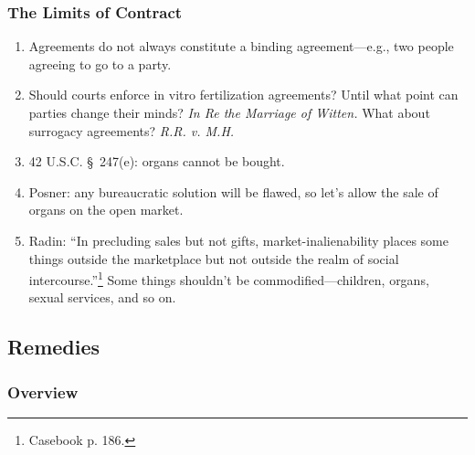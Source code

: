 \subsubsection{The Limits of Contract}

\begin{enumerate}
    \item Agreements do not always constitute a binding agreement---e.g., two 
    people agreeing to go to a party.
    \item Should courts enforce in vitro fertilization agreements? Until what 
    point can parties change their minds? \emph{In Re the Marriage of Witten.} 
    What about surrogacy agreements? \emph{R.R. v. M.H.}
    \item 42 U.S.C. \S\ 247(e): organs cannot be bought.
    \item Posner: any bureaucratic solution will be flawed, so let's allow the 
    sale of organs on the open market.
    \item Radin: ``In precluding sales but not gifts, market-inalienability 
    places some things outside the marketplace but not outside the realm of 
    social intercourse.''\footnote{Casebook p. 186.} Some things shouldn't be 
    commodified---children, organs, sexual services, and so on.
\end{enumerate}

\subsection{Remedies}

\subsubsection{Overview}

